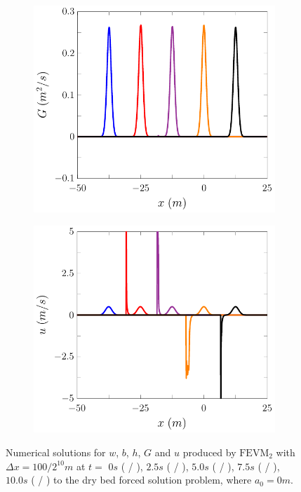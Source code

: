 \begin{figure}
\begin{subfigure}{0.5\textwidth}
		\vspace{0.5cm}
	\end{subfigure}
	\begin{subfigure}{0.5\textwidth}
		\includegraphics[width=\textwidth]{./chp5/figures/Forced/Dry/FEVMG.pdf}
	\end{subfigure}%
	\begin{subfigure}{0.5\textwidth}
		\includegraphics[width=\textwidth]{./chp5/figures/Forced/Dry/FEVMu.pdf}
	\end{subfigure}
	\caption{Numerical solutions for $w$, $b$, $h$, $G$ and $u$ produced by $\text{FEVM}_2$ with $\Delta x = 100 / 2^{10}m$ at $t=$ $0s$ ({\color{blue} \solidrule} /  ), $2.5s$ ({\color{red} \solidrule}/ ), $5.0s$ ({\color{violet!80!white} \solidrule} / ), $7.5s$ ({\color{orange} \solidrule}/ ), $10.0s$ ({\color{black} \solidrule} / ) to the dry bed forced solution problem, where $a_0 = 0m$.}
	\label{fig:ForcedFEVMP2PExAll}
\end{figure}
